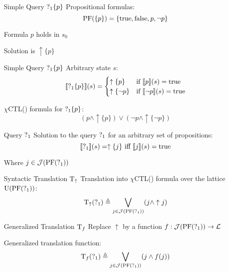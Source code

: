 %  
%  


\begin{frame}{Simple Query $\operatorname{?}_1\{p\}$}
  Propositional formulas:
  \[ \operatorname{PF}(\{p\}) = \{ \operatorname{true}, \operatorname{false}, p, \lnot p\} \]
  
  Formula $p$ holds in $s_0$
  
  Solution is $\uparrow\{p\}$
  
  
\end{frame}

\begin{frame}{Simple Query $\operatorname{?}_1\{p\}$}
  Arbitrary state $s$:
  \[ \llbracket \operatorname{?}_1\{p\} \rrbracket (s) = \begin{cases}
       \uparrow\{p\} & \text{if } \llbracket p \rrbracket (s) = \operatorname{true} \\
       \uparrow\{\lnot p\} & \text{if } \llbracket \lnot p \rrbracket (s) = \operatorname{true} \\
     \end{cases} 
  \]
  
  $\chi$CTL(\mcL) formula for $\operatorname{?}_1\{p\}$:
  \[ (p \land \uparrow\{p\}) \lor (\lnot p \land \uparrow\{\lnot p\}) \]
\end{frame}

\begin{frame}{Query $\operatorname{?}_1$}
  Solution to the query $\operatorname{?}_1$ for an arbitrary set of propositions:
  \[ \llbracket \operatorname{?}_1 \rrbracket (s) = \uparrow\{j\} \text{ iff } \llbracket j \rrbracket (s) = \operatorname{true}
  \]
  
  Where $j\in\mathcal{J}(\operatorname{PF}(\operatorname{?}_1))$
\end{frame}

\begin{frame}{Syntactic Translation $\operatorname{T}_\uparrow$}
  Translation into $\chi$CTL(\mcL) formula over the lattice $\operatorname{U}(\operatorname{PF}(\operatorname{?}_1))$:
  \[ 
    \operatorname{T}_\uparrow(\operatorname{?}_1) \triangleq \bigvee_{j\in\mathcal{J}(\operatorname{PF}(\operatorname{?}_1))} (j \land \uparrow j)
  \]
\end{frame}

\begin{frame}{Generalized Translation $\operatorname{T}_f$}
  Replace $\uparrow$ by a function $f : \mathcal{J}(\operatorname{PF}(\operatorname{?}_1)) \to \mathcal{L}$

  Generalized translation function:
  \[ 
    \operatorname{T}_f(\operatorname{?}_1) \triangleq \bigvee_{j\in\mathcal{J}(\operatorname{PF}(\operatorname{?}_1))} (j \land f(j))
  \]
\end{frame}

